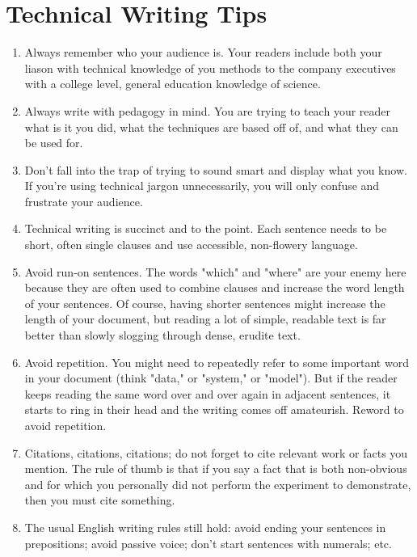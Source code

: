 \chapter{Technical Writing Tips}\label{Ch:technical_writing_tips}

\begin{enumerate}{}
\item Always remember who your audience is. Your readers include both your liason with technical knowledge of you methods to the company executives with a college level, general education knowledge of science.  
\item Always write with pedagogy in mind. You are trying to teach your reader what is it you did, what the techniques are based off of, and what they can be used for.  
\item Don't fall into the trap of trying to sound smart and display what you know. If you're using technical jargon unnecessarily, you will only confuse and frustrate your audience. 
\item Technical writing is succinct and to the point. Each sentence needs to be short, often single clauses and use accessible, non-flowery language. 
\item Avoid run-on sentences. The words "which" and "where" are your enemy here because they are often used to combine clauses and increase the word length of your sentences. Of course, having shorter sentences might increase the length of your document, but reading a lot of simple, readable text is far better than slowly slogging through dense, erudite text.
\item Avoid repetition. You might need to repeatedly refer to some important word in your document (think "data," or "system," or "model"). But if the reader keeps reading the same word over and over again in adjacent sentences, it starts to ring in their head and the writing comes off amateurish. Reword to avoid repetition.
\item Citations, citations, citations; do not forget to cite relevant work or facts you mention. The rule of thumb is that if you say a fact that is both non-obvious and for which you personally did not perform the experiment to demonstrate, then you must cite something.
\item The usual English writing rules still hold: avoid ending your sentences in prepositions; avoid passive voice; don't start sentences with numerals; etc.
\end{enumerate}


\endinput
